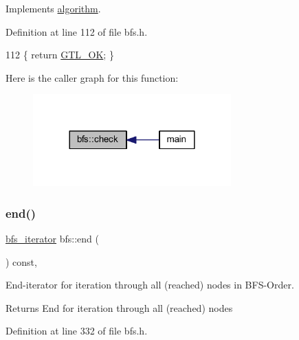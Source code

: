 Implements \mbox{\hyperlink{classalgorithm_a76361fb03ad1cf643affc51821e43bed}{algorithm}}.



Definition at line 112 of file bfs.\+h.


\begin{DoxyCode}
112 \{ \textcolor{keywordflow}{return} \mbox{\hyperlink{classalgorithm_af1a0078e153aa99c24f9bdf0d97f6710a5114c20e4a96a76b5de9f28bf15e282b}{GTL\_OK}}; \}
\end{DoxyCode}
Here is the caller graph for this function\+:
\nopagebreak
\begin{figure}[H]
\begin{center}
\leavevmode
\includegraphics[width=216pt]{classbfs_aafdf63b57eaceb5d95f441be0f9c77bb_icgraph}
\end{center}
\end{figure}
\mbox{\label{classbfs_ac35b3d3c37d33eb80adb752e17a60df9}} 
\subsubsection{\texorpdfstring{end()}{end()}}
{\footnotesize\ttfamily \mbox{\hyperlink{classbfs_a1035f068a96de0370789ec315aef4f73}{bfs\+\_\+iterator}} bfs\+::end (\begin{DoxyParamCaption}{ }\end{DoxyParamCaption}) const\hspace{0.3cm}{\ttfamily [inline]}, {\ttfamily [inherited]}}



End-\/iterator for iteration through all (reached) nodes in B\+F\+S-\/\+Order. 

\begin{DoxyReturn}{Returns}
End for iteration through all (reached) nodes 
\end{DoxyReturn}


Definition at line 332 of file bfs.\+h.


